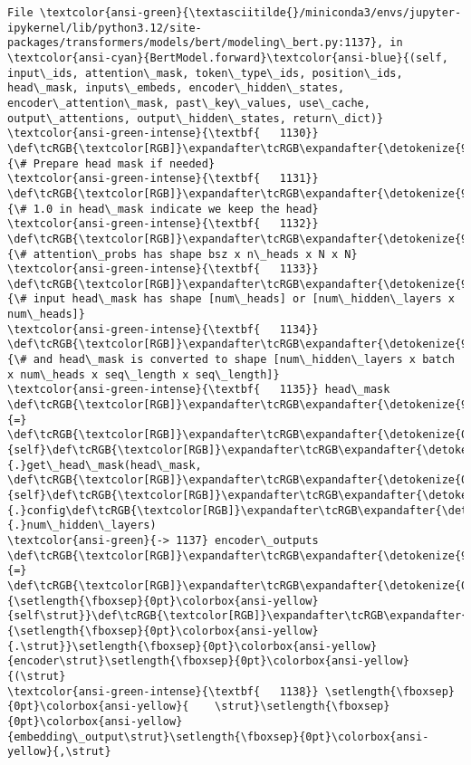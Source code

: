 \documentclass[11pt]{article}
\begin{document}
\begin{Verbatim}[commandchars=\\\{\}, frame=single, framerule=2mm, rulecolor=\color{outerrorbackground}]
File \textcolor{ansi-green}{\textasciitilde{}/miniconda3/envs/jupyter-ipykernel/lib/python3.12/site-packages/transformers/models/bert/modeling\_bert.py:1137}, in \textcolor{ansi-cyan}{BertModel.forward}\textcolor{ansi-blue}{(self, input\_ids, attention\_mask, token\_type\_ids, position\_ids, head\_mask, inputs\_embeds, encoder\_hidden\_states, encoder\_attention\_mask, past\_key\_values, use\_cache, output\_attentions, output\_hidden\_states, return\_dict)}
\textcolor{ansi-green-intense}{\textbf{   1130}} \def\tcRGB{\textcolor[RGB]}\expandafter\tcRGB\expandafter{\detokenize{95,135,135}}{\# Prepare head mask if needed}
\textcolor{ansi-green-intense}{\textbf{   1131}} \def\tcRGB{\textcolor[RGB]}\expandafter\tcRGB\expandafter{\detokenize{95,135,135}}{\# 1.0 in head\_mask indicate we keep the head}
\textcolor{ansi-green-intense}{\textbf{   1132}} \def\tcRGB{\textcolor[RGB]}\expandafter\tcRGB\expandafter{\detokenize{95,135,135}}{\# attention\_probs has shape bsz x n\_heads x N x N}
\textcolor{ansi-green-intense}{\textbf{   1133}} \def\tcRGB{\textcolor[RGB]}\expandafter\tcRGB\expandafter{\detokenize{95,135,135}}{\# input head\_mask has shape [num\_heads] or [num\_hidden\_layers x num\_heads]}
\textcolor{ansi-green-intense}{\textbf{   1134}} \def\tcRGB{\textcolor[RGB]}\expandafter\tcRGB\expandafter{\detokenize{95,135,135}}{\# and head\_mask is converted to shape [num\_hidden\_layers x batch x num\_heads x seq\_length x seq\_length]}
\textcolor{ansi-green-intense}{\textbf{   1135}} head\_mask \def\tcRGB{\textcolor[RGB]}\expandafter\tcRGB\expandafter{\detokenize{98,98,98}}{=} \def\tcRGB{\textcolor[RGB]}\expandafter\tcRGB\expandafter{\detokenize{0,135,0}}{self}\def\tcRGB{\textcolor[RGB]}\expandafter\tcRGB\expandafter{\detokenize{98,98,98}}{.}get\_head\_mask(head\_mask, \def\tcRGB{\textcolor[RGB]}\expandafter\tcRGB\expandafter{\detokenize{0,135,0}}{self}\def\tcRGB{\textcolor[RGB]}\expandafter\tcRGB\expandafter{\detokenize{98,98,98}}{.}config\def\tcRGB{\textcolor[RGB]}\expandafter\tcRGB\expandafter{\detokenize{98,98,98}}{.}num\_hidden\_layers)
\textcolor{ansi-green}{-> 1137} encoder\_outputs \def\tcRGB{\textcolor[RGB]}\expandafter\tcRGB\expandafter{\detokenize{98,98,98}}{=} \def\tcRGB{\textcolor[RGB]}\expandafter\tcRGB\expandafter{\detokenize{0,135,0}}{\setlength{\fboxsep}{0pt}\colorbox{ansi-yellow}{self\strut}}\def\tcRGB{\textcolor[RGB]}\expandafter\tcRGB\expandafter{\detokenize{98,98,98}}{\setlength{\fboxsep}{0pt}\colorbox{ansi-yellow}{.\strut}}\setlength{\fboxsep}{0pt}\colorbox{ansi-yellow}{encoder\strut}\setlength{\fboxsep}{0pt}\colorbox{ansi-yellow}{(\strut}
\textcolor{ansi-green-intense}{\textbf{   1138}} \setlength{\fboxsep}{0pt}\colorbox{ansi-yellow}{    \strut}\setlength{\fboxsep}{0pt}\colorbox{ansi-yellow}{embedding\_output\strut}\setlength{\fboxsep}{0pt}\colorbox{ansi-yellow}{,\strut}

\end{Verbatim}
\end{document}

